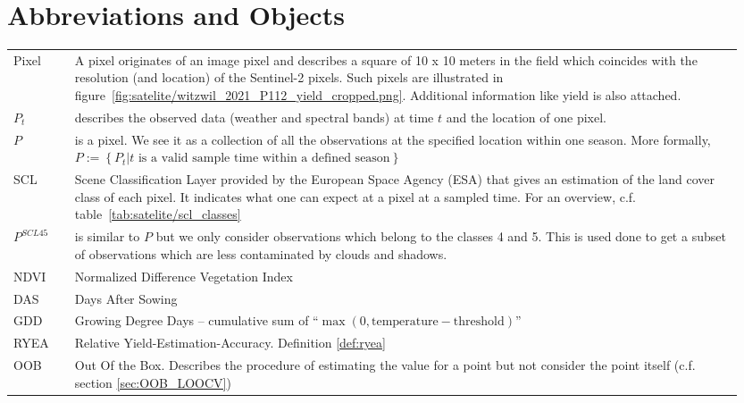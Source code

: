 \section*{Abbreviations and Objects}
\begin{longtable}{p{0.08\linewidth} p{0.87\linewidth}}
Pixel	
		& A pixel originates of an image pixel and describes a square of 10 x 10 meters in the field which coincides with the resolution (and location) of the Sentinel-2 pixels. Such pixels are illustrated in figure~\ref{fig:satelite/witzwil_2021_P112_yield_cropped.png}. Additional information like yield is also attached.\\

$P_t$	
		& describes the observed data (weather and spectral bands) at time $t$ and the location of one pixel. \\

$P$	
		& is a pixel. We see it as a collection of all the observations at the specified location within one season. More formally, $P := \left\{P_t | t\text{ is a valid sample time within a defined season}\right\}$\\

SCL	
		& Scene Classification Layer provided by the European Space Agency (ESA) that gives an estimation of the land cover class of each pixel. It indicates what one can expect at a pixel at a sampled time. For an overview, c.f. table~\ref{tab:satelite/scl_classes}\\

$P^{SCL45}$	
		& is similar to $P$ but we only consider observations which belong to the classes 4 and 5. This is used done to get a subset of observations which are less contaminated by clouds and shadows.\\

NDVI	
		& Normalized Difference Vegetation Index \citep{rouseMonitoringVernalAdvancement1974}\\

DAS	
		& Days After Sowing\\

GDD	
		& Growing Degree Days -- cumulative sum of ``$\max(0, \text{temperature}-\text{threshold})$''\\

RYEA 	
		& Relative Yield-Estimation-Accuracy. Definition \ref{def:ryea}\\

OOB 	
		& Out Of the Box. Describes the procedure of  estimating the value for a point but not consider the point itself (c.f. section \ref{sec:OOB_LOOCV})\\
\end{longtable} \renewcommand{\arraystretch}{1}


